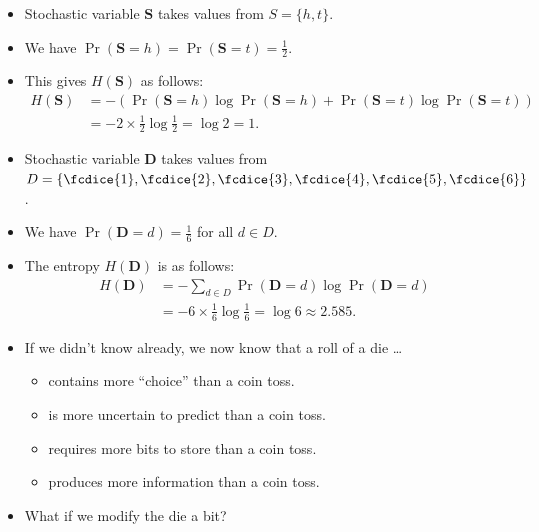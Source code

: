 \documentclass{beamer}
\let\stoch\mathbf{}
\begin{document}
\begin{frame}
  \begin{example}
    \begin{itemize}
      \item Stochastic variable \(\stoch{S}\) takes values from \(S = \{h, 
          t\}\).
      \item We have \(\Pr(\stoch S = h) = \Pr(\stoch S = t) = \frac{1}{2}.\)
      \item This gives \(H(\stoch S)\) as follows:
        \begin{align*}
          H(\stoch S) &= -\left( \Pr(\stoch S = h)\log \Pr(\stoch S = h) 
            + \Pr(\stoch S = t) \log \Pr(\stoch S = t) \right) \\
          &= -2\times \frac{1}{2}\log \frac{1}{2} = \log 2 = 1.
        \end{align*}
    \end{itemize}
  \end{example}
\end{frame}

\begin{frame}
  \begin{example}
    \begin{itemize}
      \item Stochastic variable \(\stoch D\) takes values from \(D 
          = \{\fcdice{1}, \fcdice{2}, \fcdice{3}, \fcdice{4}, \fcdice{5}, 
          \fcdice{6}\}\).
      \item We have \(\Pr(\stoch D = d) = \frac{1}{6}\) for all \(d\in D\).
      \item The entropy \(H(\stoch D)\) is as follows:
        \begin{align*}
          H(\stoch D) &= -\sum_{d\in D} \Pr(\stoch D = d)\log\Pr(\stoch D = d) \\
          &= -6\times \frac{1}{6}\log\frac{1}{6} = \log 6 \approx 2.585.
        \end{align*}
    \end{itemize}
  \end{example}
\end{frame}

\begin{frame}
  \begin{remark}
    \begin{itemize}
      \item If we didn't know already, we now know that a roll of a die \dots
        \begin{itemize}
          \item contains more \enquote{choice} than a coin toss.
          \item is more uncertain to predict than a coin toss.
          \item requires more bits to store than a coin toss.
          \item produces more information than a coin toss.
        \end{itemize}

      \item What if we modify the die a bit?
    \end{itemize}
  \end{remark}
\end{frame}
\end{document}
